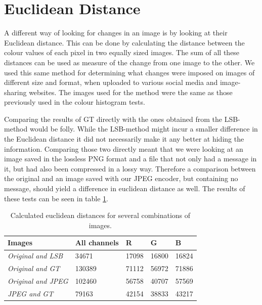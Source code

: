 \section{Euclidean Distance}
A different way of looking for changes in an image is by looking at their Euclidean distance.
This can be done by calculating the distance between the colour values of each pixel in two equally sized images.
The sum of all these distances can be used as measure of the change from one image to the other.
We used this same method for determining what changes were imposed on images of different size and format, when uploaded to various social media and image-sharing websites.
The images used for the method were the same as those previously used in the colour histogram tests.

Comparing the results of GT directly with the ones obtained from the LSB-method would be folly.
While the LSB-method might incur a smaller difference in the Euclidean distance it did not necessarily make it any better at hiding the information.
Comparing those two directly meant that we were looking at an image saved in the lossless PNG format and a file that not only had a message in it, but had also been compressed in a lossy way.
Therefore a comparison between the original and an image saved with our JPEG encoder, but containing no message, should yield a difference in euclidean distance as well.
The results of these tests can be seen in table \ref {fig:euclidean_distance}.

\begin{table}[]
	\centering
	\begin{tabular}{@{}lllll@{}}
		\toprule
		\textbf{Images}            & \textbf{All channels} & \textbf{R} & \textbf{G} & \textbf{B} \\ \midrule
		\textit{Original and LSB}  & 34671                 & 17098      & 16800      & 16824      \\
		\textit{Original and GT}   & 130389                & 71112      & 56972      & 71886      \\
		\textit{Original and JPEG} & 102460                & 56758      & 40707      & 57569      \\
		\textit{JPEG and GT}       & 79163                 & 42154      & 38833      & 43217     
	\end{tabular}
	\caption{Calculated euclidean distances for several combinations of images.}
	\label{fig:euclidean_distance}
\end{table}


